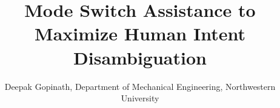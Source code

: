 \documentclass[conference]{IEEEtran}
\begin{document}
\title{Mode Switch Assistance to\\Maximize Human Intent Disambiguation}
\author{Deepak Gopinath, Department of Mechanical Engineering, Northwestern University}




% 
%
%
%
%


\maketitle
\end{document}
